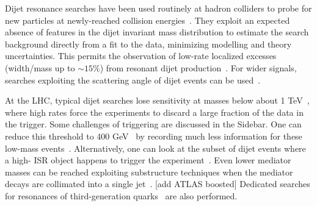 Dijet resonance searches have been used routinely at hadron colliders to probe for new particles at newly-reached collision energies~\cite{Harris:2011bh}. 
They exploit an expected absence of features in the dijet invariant mass distribution to estimate the search background directly from a fit to the data, minimizing modelling and theory uncertainties.
This permits the observation of low-rate localized excesses (width/mass up to $\sim15$\%) from resonant dijet production~\cite{Aaboud:2017yvp,CMS-PAS-EXO-16-056}.
For wider signals, searches exploiting the scattering angle of dijet events can be used~\cite{CMS-PAS-EXO-16-046,Aaboud:2017yvp}. 



At the LHC, typical dijet searches lose sensitivity at masses below about 1 TeV~\cite{An:2012ue,Dobrescu:2013coa}, where high rates force the experiments to discard a large fraction of the data in the trigger.
Some challenges of triggering are discussed in the Sidebar. 
One can reduce this threshold to 400 GeV~\cite{CMS-PAS-EXO-16-056,ATLAS:2016xiv} by recording much less information for these low-mass events~\cite{Aaij:2016rxn,CMS-PAS-EXO-16-056,Aaboud:2016leb}.
Alternatively, one can look at the subset of dijet events where a high-\pt{} ISR object happens to trigger the experiment~\cite{ATLAS:2016bvn,Sirunyan:2017nvi}. %
Even lower mediator masses can be reached exploiting substructure techniques when the mediator decays are collimated into a single jet~\cite{Sirunyan:2017nvi}.
[add ATLAS boosted]
Dedicated searches for resonances of third-generation quarks~\cite{lowMassDiB,CMS-PAS-HIG-16-025,Aaboud:2017hnm} are also performed.

